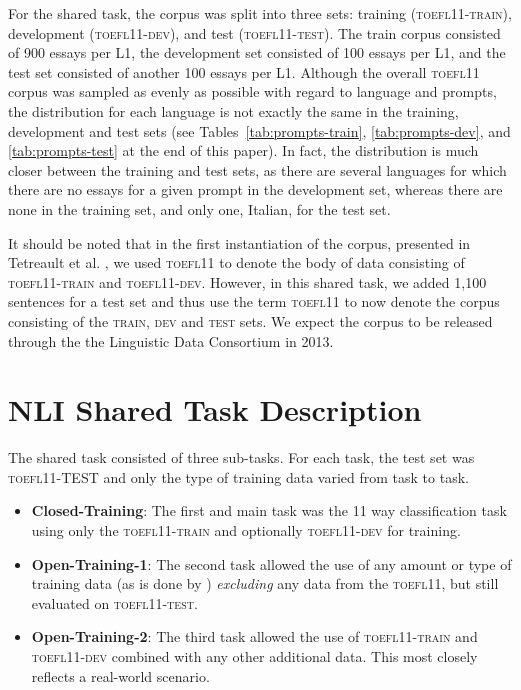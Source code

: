 \documentclass[11pt,letterpaper]{article}
\begin{document}
For the shared task, the corpus was split into three sets: training (\textsc{toefl11-train}),
development (\textsc{toefl11-dev}), and test (\textsc{toefl11-test}). The train corpus consisted
of 900 essays per L1, the development set consisted of 100 essays per L1,
and the test set consisted of another 100 essays per L1.
Although the overall \textsc{toefl11} corpus was sampled as evenly
as possible with regard to language and prompts, the distribution for each
language is not exactly the same in the training, development and test sets (see
Tables~\ref{tab:prompts-train}, \ref{tab:prompts-dev}, and
\ref{tab:prompts-test} at the end of this paper). In fact, the distribution is much closer between the
training and test sets, as there are several languages for which there are no
essays for a given prompt in the development set, whereas there are none in the
training set, and only one, Italian, for the test set.

It should be noted that in the first instantiation of the corpus,
presented in Tetreault et al. , we used \textsc{toefl11}
to denote the body of data consisting of \textsc{toefl11-train} and \textsc{toefl11-dev}.
However, in this shared task, we added 1,100 sentences for a test
set and thus use the term \textsc{toefl11} to now denote the corpus
consisting of the \textsc{train}, \textsc{dev} and \textsc{test} sets.  We expect the corpus
to be released through the the Linguistic Data Consortium in 2013.


\section{NLI Shared Task Description}
\label{sec-shared-task-description}
The shared task consisted of three sub-tasks. For each task, the
test set was \textsc{toefl11-TEST} and only the type of training data varied from
task to task.

\begin{itemize}
\item {\bf Closed-Training}:  The first and main task was the 11 way
classification task using only the \textsc{toefl11-train} and optionally \textsc{toefl11-dev} for training.
\item {\bf Open-Training-1}: The second task allowed the use of any amount or
type of training data (as is done by )
\emph{excluding} any data from the \textsc{toefl11}, but still evaluated on \textsc{toefl11-test}.
\item {\bf Open-Training-2}: The third task allowed the use of \textsc{toefl11-train} and
\textsc{toefl11-dev} combined with any other additional data. This most closely reflects
a real-world scenario.
\end{itemize}
\end{document}

